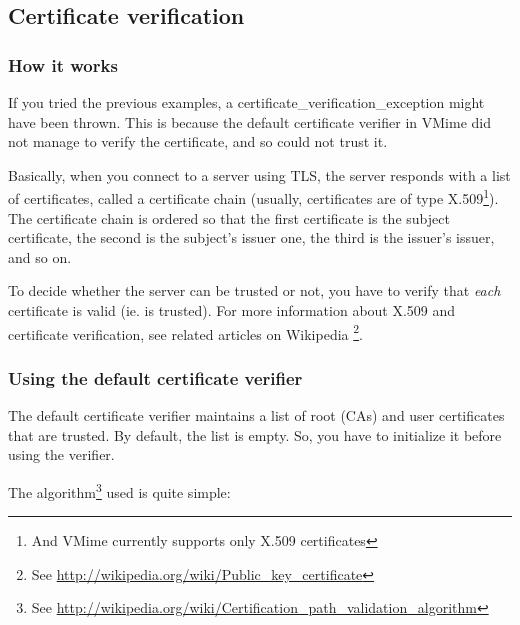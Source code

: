 
\subsection{Certificate verification} %

\subsubsection{How it works} %

If you tried the previous examples, a
{\vcode certificate\_verification\_exception} might have been thrown.
This is because the default certificate verifier in VMime did not manage to
verify the certificate, and so could not trust it.

Basically, when you connect to a server using TLS, the server responds with
a list of certificates, called a certificate chain (usually, certificates are
of type X.509\footnote{And VMime currently supports only X.509 certificates}).
The certificate chain is ordered so that the first certificate is the subject
certificate, the second is the subject's issuer one, the third is the issuer's
issuer, and so on.

To decide whether the server can be trusted or not, you have to verify that
\emph{each} certificate is valid (ie. is trusted). For more information
about X.509 and certificate verification, see related articles on Wikipedia
\footnote{See \url{http://wikipedia.org/wiki/Public\_key\_certificate}}.

\subsubsection{Using the default certificate verifier} %

The default certificate verifier maintains a list of root (CAs) and user
certificates that are trusted. By default, the list is empty. So, you have
to initialize it before using the verifier.

The algorithm\footnote{See
\url{http://wikipedia.org/wiki/Certification\_path\_validation\_algorithm}}
used is quite simple:

